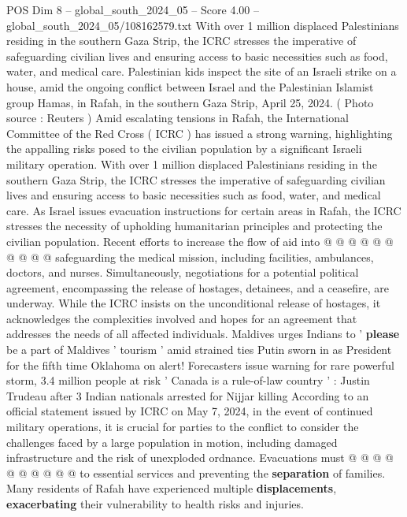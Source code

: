 \begin{textsample}{POS Dim 8 – global\_south\_2024\_05 – Score 4.00 – global\_south\_2024\_05/108162579.txt}  \label{ex:f8_pos_344}
With over 1 million displaced Palestinians residing in the southern Gaza Strip, the ICRC stresses the imperative of safeguarding civilian lives and ensuring access to basic necessities such as food, water, and medical care.
Palestinian kids inspect the site of an Israeli strike on a house, amid the ongoing conflict between Israel and the Palestinian Islamist group Hamas, in Rafah, in the southern Gaza Strip, April 25, 2024. ( Photo source : Reuters ) Amid escalating tensions in Rafah, the International Committee of the Red Cross ( ICRC ) has issued a strong warning, highlighting the appalling risks posed to the civilian population by a significant Israeli military operation.
With over 1 million displaced Palestinians residing in the southern Gaza Strip, the ICRC stresses the imperative of safeguarding civilian lives and ensuring access to basic necessities such as food, water, and medical care.
As Israel issues evacuation instructions for certain areas in Rafah, the ICRC stresses the necessity of upholding humanitarian principles and protecting the civilian population.
Recent efforts to increase the flow of aid into @ @ @ @ @ @ @ @ @ @ safeguarding the medical mission, including facilities, ambulances, doctors, and nurses.
Simultaneously, negotiations for a potential political agreement, encompassing the release of hostages, detainees, and a ceasefire, are underway.
While the ICRC insists on the unconditional release of hostages, it acknowledges the complexities involved and hopes for an agreement that addresses the needs of all affected individuals.
Maldives urges Indians to ' \textbf{please} be a part of Maldives ' tourism ' amid strained ties Putin sworn in as President for the fifth time Oklahoma on alert!
Forecasters issue warning for rare powerful storm, 3.4 million people at risk ' Canada is a rule-of-law country ' : Justin Trudeau after 3 Indian nationals arrested for Nijjar killing According to an official statement issued by ICRC on May 7, 2024, in the event of continued military operations, it is crucial for parties to the conflict to consider the challenges faced by a large population in motion, including damaged infrastructure and the risk of unexploded ordnance.
Evacuations must @ @ @ @ @ @ @ @ @ @ to essential services and preventing the \textbf{separation} of families.
Many residents of Rafah have experienced multiple \textbf{displacements}, \textbf{exacerbating} their vulnerability to health risks and injuries.

\end{textsample}
